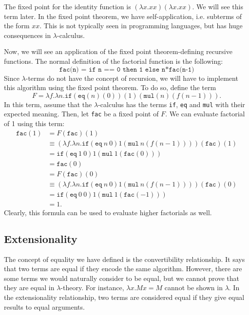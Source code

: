 \documentclass[a4paper, openany]{memoir}
\theoremstyle{definition}
\begin{document}
    The fixed point for the identity function is $(\lambda x.xx)(\lambda x.xx)$. We will see this term later. In the fixed point theorem, we have self-application, i.e. subterms of the form $xx$. This is not typically seen in programming languages, but has huge consequences in $\lambda$-calculus.

    Now, we will see an application of the fixed point theorem-defining recursive functions. The normal definition of the factorial function is the following:
    \[\texttt{fac(n) = if n == 0 then 1 else n*fac(n-1)}\]
    Since $\lambda$-terms do not have the concept of recursion, we will have to implement this algorithm using the fixed point theorem. To do so, define the term
    \[F = \lambda f.\lambda n.\texttt{if} (\texttt{eq}(n)(0)) (1) (\texttt{mul}(n)(f(n-1))).\]
    In this term, assume that the $\lambda$-calculus has the terms \texttt{if}, \texttt{eq} and \texttt{mul} with their expected meaning. Then, let \texttt{fac} be a fixed point of $F$. We can evaluate factorial of 1 using this term:
    \begin{align*}
        \texttt{fac}(1) &= F(\texttt{fac})(1) \\
        &\equiv (\lambda f.\lambda n.\texttt{if} (\texttt{eq} \ n \ 0) 1 (\texttt{mul} \ n (f(n-1))))(\texttt{fac})(1) \\
        &= \texttt{if} (\texttt{eq} \ 1 \ 0) 1 (\texttt{mul} \ 1 (\texttt{fac}(0))) \\
        &= \texttt{fac}(0) \\
        &= F(\texttt{fac})(0) \\
        &\equiv (\lambda f.\lambda n.\texttt{if} (\texttt{eq} \ n \ 0) 1 (\texttt{mul} \ n (f(n-1))))(\texttt{fac})(0) \\
        &= \texttt{if} (\texttt{eq} \ 0 \ 0) 1 (\texttt{mul} \ 1 (\texttt{fac}(-1)))  \\
        &= 1.
    \end{align*}
    \noindent Clearly, this formula can be used to evaluate higher factorials as well.
    
    \subsection{Extensionality}
    The concept of equality we have defined is the convertibility relationship. It says that two terms are equal if they encode the same algorithm. However, there are some terms we would naturally consider to be equal, but we cannot prove that they are equal in $\lambda$-theory. For instance, $\lambda x.Mx = M$ cannot be shown in $\lambda$. In the extensionality relationship, two terms are considered equal if they give equal results to equal arguments.
\end{document}
